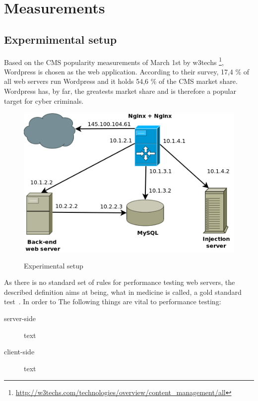 \documentclass[Measurements]{subfiles}
\begin{document}
\section{Measurements}
\label{sec:Measurements}

\subsection{Expermimental setup}
Based on the \ac{CMS} popularity measurements of March 1st by w3techs \footnote{\url{http://w3techs.com/technologies/overview/content_management/all}}, Wordpress is chosen as the web application. According to their survey, 17,4 \% of all web servers run Wordpress and it holds 54,6 \% of the CMS market share. Wordpress has, by far, the greatests market share and is therefore a popular target for cyber criminals.

\begin{figure}[h]
\caption{Experimental setup}
\centering
\includegraphics[scale=0.4] {images/infrastructure.png}
\label{fig:Experimental setup}
\end{figure}

As there is no standard set of rules for performance testing web servers, the described definition aims at being, what in medicine is called, a gold standard test~\cite{wacholder1993validation}.
In order to The following things are vital to performance testing:

\begin{description} 
 \item[server-side] text 
 \item[client-side] text
\end{description}
\end{document}
